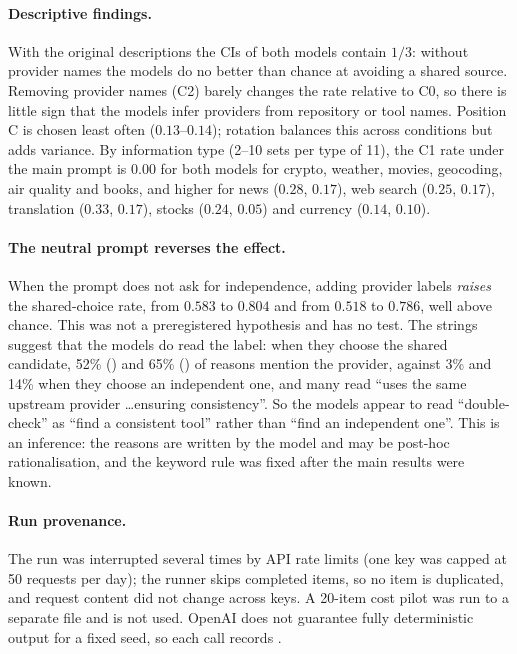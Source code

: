 \paragraph{Descriptive findings.} With the original descriptions the CIs of both models contain $1/3$: without provider names the models do no better than chance at avoiding a shared source. Removing provider names (C2) barely changes the rate relative to C0, so there is little sign that the models infer providers from repository or tool names. Position C is chosen least often ($0.13$--$0.14$); rotation balances this across conditions but adds variance. By information type (2--10 sets per type of 11), the C1 rate under the main prompt is $0.00$ for both models for crypto, weather, movies, geocoding, air quality and books, and higher for news ($0.28$, $0.17$), web search ($0.25$, $0.17$), translation ($0.33$, $0.17$), stocks ($0.24$, $0.05$) and currency ($0.14$, $0.10$).

\paragraph{The neutral prompt reverses the effect.} When the prompt does not ask for independence, adding provider labels \emph{raises} the shared-choice rate, from $0.583$ to $0.804$ and from $0.518$ to $0.786$, well above chance. This was not a preregistered hypothesis and has no test. The  strings suggest that the models do read the label: when they choose the shared candidate, 52\% () and 65\% () of reasons mention the provider, against 3\% and 14\% when they choose an independent one, and many read ``uses the same upstream provider \ldots ensuring consistency''. So the models appear to read ``double-check'' as ``find a consistent tool'' rather than ``find an independent one''. This is an inference: the reasons are written by the model and may be post-hoc rationalisation, and the keyword rule was fixed after the main results were known.

\paragraph{Run provenance.} The run was interrupted several times by API rate limits (one key was capped at 50 requests per day); the runner skips completed items, so no item is duplicated, and request content did not change across keys. A 20-item cost pilot was run to a separate file and is not used. OpenAI does not guarantee fully deterministic output for a fixed seed, so each call records .

